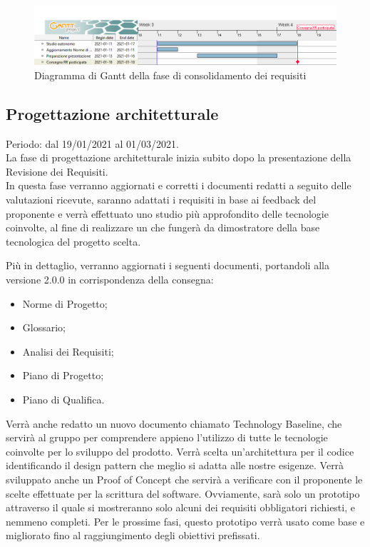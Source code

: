 \documentclass[../piano_di_progetto.tex]{subfiles}
\begin{document}
\begin{figure}[H]
\centering
\includegraphics[width=18cm]{img/gantt/01_RR_consolidamento.png}
\caption{ Diagramma di Gantt della fase di consolidamento dei requisiti}
\end{figure}

\subsection{Progettazione architetturale}%
\label{sub:prog_arc}
Periodo: dal 19/01/2021 al 01/03/2021.\\
La fase di progettazione architetturale inizia subito dopo la presentazione della Revisione dei Requisiti.\\
In questa fase verranno aggiornati e corretti i documenti redatti a seguito delle valutazioni ricevute, saranno adattati i requisiti in base ai feedback del proponente e verrà effettuato uno studio più approfondito delle tecnologie coinvolte, al fine di realizzare un  che fungerà da dimostratore della base tecnologica del progetto scelta. 

Più in dettaglio, verranno aggiornati i seguenti documenti, portandoli alla versione 2.0.0 in corrispondenza della consegna:

\begin{itemize}
    \item Norme di Progetto;
    \item Glossario;
    \item Analisi dei Requisiti;
    \item Piano di Progetto;
    \item Piano di Qualifica.
\end{itemize}

Verrà anche redatto un nuovo documento chiamato Technology Baseline, che servirà al gruppo per comprendere appieno l'utilizzo di tutte le tecnologie coinvolte per lo sviluppo del prodotto. Verrà scelta un'architettura per il codice identificando il design pattern che meglio si adatta alle nostre esigenze. Verrà sviluppato anche un Proof of Concept che servirà a verificare con il proponente le scelte effettuate per la scrittura del software. Ovviamente, sarà solo un prototipo attraverso il quale si mostreranno solo alcuni dei requisiti obbligatori richiesti, e nemmeno completi. Per le prossime fasi, questo prototipo verrà usato come base e migliorato fino al raggiungimento degli obiettivi prefissati.
\end{document}
